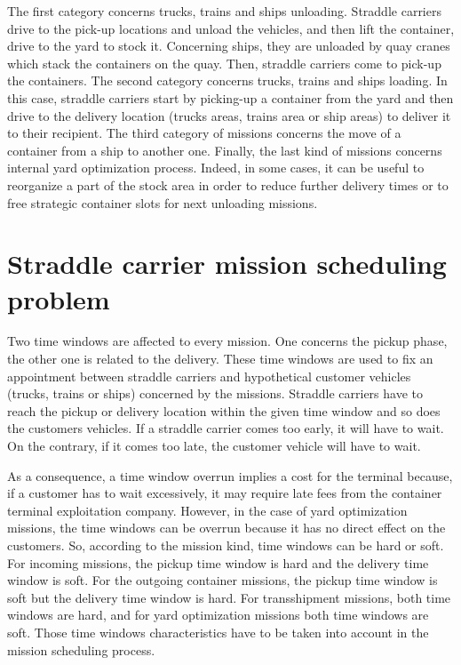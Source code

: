 \documentclass[a4paper,10pt]{article}
\begin{document}
The first category concerns trucks, trains and ships unloading. Straddle carriers drive to the pick-up locations and unload the vehicles, and then lift the container, drive to the yard to stock it. Concerning ships, they are unloaded by quay cranes which stack the containers on the quay. Then, straddle carriers come to pick-up the containers.
The second category concerns trucks, trains and ships loading. In this case, straddle carriers start by picking-up a container from the yard and then drive to the delivery location (trucks areas, trains area or ship areas) to deliver it to their recipient.
The third category of missions concerns the move of a container from a ship to another one.
Finally, the last kind of missions concerns internal yard optimization process. Indeed, in some cases, it can be useful to reorganize a part of the stock area in order to reduce further delivery times or to free strategic container slots for next unloading missions.


\section{Straddle carrier mission scheduling problem}

Two time windows are affected to every mission. One concerns the pickup phase, the other one is related to the delivery. These time windows are used to fix an appointment between straddle carriers and hypothetical customer vehicles (trucks, trains or ships) concerned by the missions. Straddle carriers have to reach the pickup or delivery location within the given time window and so does the customers vehicles. If a straddle carrier comes too early, it will have to wait. On the contrary, if it comes too late, the customer vehicle will have to wait.

As a consequence, a time window overrun implies a cost for the terminal because, if a customer has to wait excessively, it may require late fees from the container terminal exploitation company. However, in the case of yard optimization missions, the time windows can be overrun because it has no direct effect on the customers. So, according to the mission kind, time windows can be hard or soft. For incoming missions, the pickup time window is hard and the delivery time window is soft. For the outgoing container missions, the pickup time window is soft but the delivery time window is hard. For transshipment missions, both time windows are hard, and for yard optimization missions both time windows are soft. Those time windows characteristics have to be taken into account in the mission scheduling process\cite{Lesauvage2009}.
\end{document}
